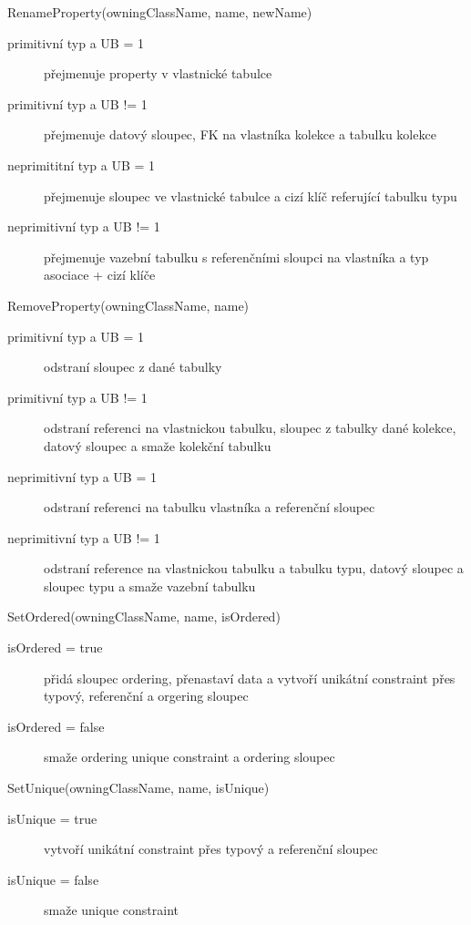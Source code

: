 \documentclass[11pt,twoside,a4paper]{book}
\begin{document}
\begin{list}{Operace :}{}
  \item RenameProperty(owningClassName, name, newName)
  \begin{description}
  \item[primitivní typ a UB = 1] přejmenuje property v vlastnické
  tabulce
  \item[primitivní typ a UB != 1] přejmenuje datový sloupec, FK
  na vlastníka kolekce a tabulku kolekce
  \item[neprimititní typ a UB = 1] přejmenuje sloupec ve vlastnické tabulce a
  cizí klíč referující tabulku typu
  \item[neprimitivní typ a UB != 1] přejmenuje vazební tabulku s referenčními
  sloupci na vlastníka a typ asociace + cizí klíče
  \end{description}

  \item RemoveProperty(owningClassName, name)
  \begin{description}
  	\item[primitivní typ a UB = 1] odstraní sloupec z dané tabulky
	\item[primitivní typ a UB != 1] odstraní referenci na vlastnickou tabulku,
	sloupec z tabulky dané kolekce, datový sloupec a smaže kolekční tabulku
	\item[neprimitivní typ a UB = 1] odstraní referenci na tabulku vlastníka a
	referenční sloupec
	\item[neprimitivní typ a UB != 1] odstraní reference na vlastnickou tabulku a
	tabulku typu, datový sloupec a sloupec typu a smaže vazební tabulku
  \end{description}


  \item SetOrdered(owningClassName, name, isOrdered)
  \begin{description}
  	\item[isOrdered = true] přidá sloupec ordering, přenastaví data a vytvoří
  	unikátní constraint přes typový, referenční a orgering sloupec
	\item[isOrdered = false] smaže ordering unique constraint a ordering sloupec 
  \end{description}

  \item SetUnique(owningClassName, name, isUnique)
  \begin{description}
  	\item[isUnique = true] vytvoří unikátní constraint přes typový a referenční
  	sloupec
	\item[isUnique = false] smaže unique constraint
  \end{description}
  

\end{list}
\end{document}
